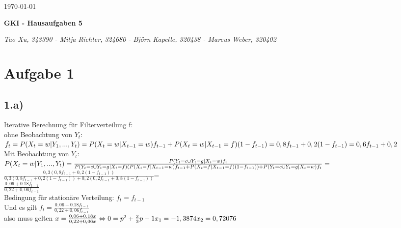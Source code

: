 \documentclass[a4paper]{article}
\begin{document}
  \begin{flushright}
    \today
  \end{flushright}
  \begin{center}
    \Large\textbf{{GKI - Hausaufgaben 5}}\\
  \end{center}

  \begin{center}
        \large\textsl{Tao Xu, 343390 - Mitja Richter, 324680 - Björn Kapelle, 320438 - Marcus Weber, 320402}\\
  \end{center}
  
\section*{Aufgabe 1}

\subsection*{1.a)}
Iterative Berechnung für Filterverteilung f:\\
ohne Beobachtung von $Y_t$:\\

$f_t= P(X_t=w|Y_1,...,Y_t) =\\ P(X_t=w|X_{t-1}=w)f_{t-1} + P(X_t=w|X_{t-1}=f)(1-f_{t-1}) = \\
0,8f_{t-1} +0,2(1-f_{t-1}) =\\
0,6f_{t-1}+0,2$\\

Mit Beobachtung von $Y_t$:\\
$P(X_t=w|Y_1,...,Y_t) = \\
\frac{P(Y_t=c\cup Y_t=g|X_t=w)f_t}{P(Y_t=c\cup Y_t=g|X_t=f)(P(X_t=f|X_{t-1}=w)f_{t-1} + P(X_t=f|X_{t-1}=f)(1-f_{t-1})) + P(Y_t=c\cup Y_t=g|X_t=w)f_t}=\\$
$\frac{0,3(0,8f_{t-1} +0,2(1-f_{t-1}))}{0,3(0,8f_{t-1} +0,2(1-f_{t-1}))+0,2(0,2f_{t-1} +0,8(1-f_{t-1}))} $=\\
$\frac{0,06+0.18f_{t-1}}{0,22+0,06f_{t-1}}
$\\

Bedingung für stationäre Verteilung: $f_t = f_{t-1}$\\
Und es gilt $f_t=\frac{0,06+0.18f_{t-1}}{0,22+0,06f_{t-1}}$\\
also muss gelten $x=\frac{0,06+0.18x}{0,22+0,06x}\\
\Leftrightarrow 0=p^2+\frac{2}{3}p-1\\
x_1=-1,3874\\
x_2=0,72076
$\\
\end{document}
